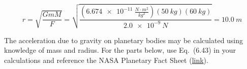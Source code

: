 \documentclass[addpoints]{exam}
\begin{document}
\begin{questions}
\begin{solution}
\begin{equation*}
    r = \sqrt{\frac{GmM}{F}} = 
    \sqrt{\frac{\left(\SI{6.674e-11}{\frac{N \cdot m^2}{kg^2}}\right) \left(\SI{50}{kg}\right) \left(\SI{60}{kg}\right)}{\SI{2.0e-9}{N}}} = \SI{10.0}{m}
\end{equation*}
\end{solution}

\question 
The acceleration due to gravity on planetary bodies may be calculated using knowledge of mass and radius. For the parts below, use Eq.~(6.43) in your calculations and reference the NASA Planetary Fact Sheet (\href{https://nssdc.gsfc.nasa.gov/planetary/factsheet/}{link}).

\end{questions}
\end{document}
